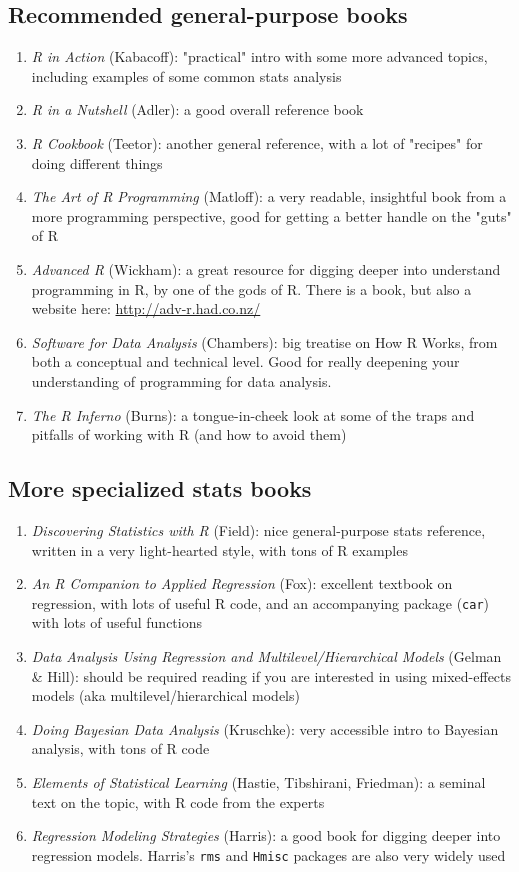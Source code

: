 \documentclass{tufte-handout}
\begin{document}
\subsection*{Recommended general-purpose books}
\label{sec:orgheadline12}
\begin{enumerate}
\item \emph{R in Action} (Kabacoff): "practical" intro with some more advanced topics, including examples of some common stats analysis
\item \emph{R in a Nutshell} (Adler): a good overall reference book
\item \emph{R Cookbook} (Teetor): another general reference, with a lot of "recipes" for doing different things
\item \emph{The Art of R Programming} (Matloff): a very readable, insightful book from a more programming perspective, good for getting a better handle on the "guts" of R
\item \emph{Advanced R} (Wickham): a great resource for digging deeper into understand programming in R, by one of the gods of R. There is a book, but also a website here: \url{http://adv-r.had.co.nz/}
\item \emph{Software for Data Analysis} (Chambers): big treatise on How R Works, from both a conceptual and technical level. Good for really deepening your understanding of programming for data analysis.
\item \emph{The R Inferno} (Burns): a tongue-in-cheek look at some of the traps and pitfalls of working with R (and how to avoid them)
\end{enumerate}
\subsection*{More specialized stats books}
\label{sec:orgheadline13}
\begin{enumerate}
\item \emph{Discovering Statistics with R} (Field): nice general-purpose stats reference, written in a very light-hearted style, with tons of R examples
\item \emph{An R Companion to Applied Regression} (Fox): excellent textbook on regression, with lots of useful R code, and an accompanying package (\texttt{car}) with lots of useful functions
\item \emph{Data Analysis Using Regression and Multilevel/Hierarchical Models} (Gelman \& Hill): should be required reading if you are interested in using mixed-effects models (aka multilevel/hierarchical models)
\item \emph{Doing Bayesian Data Analysis} (Kruschke): very accessible intro to Bayesian analysis, with tons of R code
\item \emph{Elements of Statistical Learning} (Hastie, Tibshirani, Friedman): a seminal text on the topic, with R code from the experts
\item \emph{Regression Modeling Strategies} (Harris): a good book for digging deeper into regression models. Harris's \texttt{rms} and \texttt{Hmisc} packages are also very widely used
\end{enumerate}
\end{document}
